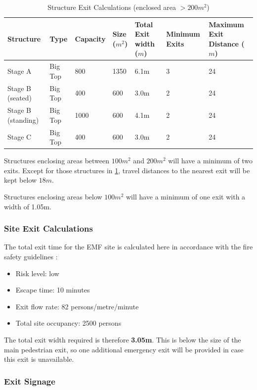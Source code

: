 \begin{table}[h!]
    \caption{Structure Exit Calculations (enclosed area $>200m^2$)}
    \label{table:exit}
\centering
\begin{tabular}{| l | l | l | l | p{1.5cm} | l | p{2.5cm} |}
\hline
    \textbf{Structure} & \textbf{Type} & \textbf{Capacity} & \textbf{Size ($m^2$)} &
    \textbf{Total Exit width ($m$)} & \textbf{Minimum Exits} & \textbf{Maximum Exit Distance ($m$)} \\ \hline
    Stage A  & Big Top & 800  & 1350  & 6.1m & 3 & 24  \\
    Stage B (seated)  & Big Top & 400  & 600 & 3.0m & 2 & 24  \\
    Stage B (standing) & Big Top & 1000 & 600 & 4.1m & 2 & 24 \\
    Stage C  & Big Top & 400  & 600   & 3.0m & 2 & 24  \\
\hline
\end{tabular}
\end{table}

Structures enclosing areas between $100m^2$ and $200m^2$ will have a minimum of two exits. Except
for those structures in \cref{table:exit}, travel distances to the nearest exit will be kept below $18m$.

Structures enclosing areas below $100m^2$ will have a minimum of one exit with a width of 1.05m.

\subsubsection{Site Exit Calculations}
The total exit time for the EMF site is calculated here in accordance with the fire safety
guidelines \cite{firesafety}:

\begin{itemize}
\tightlist
\item Risk level: low
\item Escape time: 10 minutes
\item Exit flow rate: 82 persons/metre/minute
\item Total site occupancy: 2500 persons
\end{itemize}

The total exit width required is therefore \textbf{3.05m}. This is below the size of the
main pedestrian exit, so one additional emergency exit will be provided in case this exit
is unavailable.

\subsubsection{Exit Signage}

